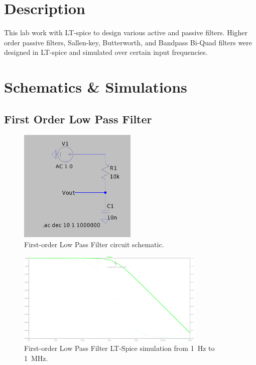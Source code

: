 \documentclass[CMPE]{../KGCOEReport}
\begin{document}
    \maketitle
    \section*{Description}

   	This lab work with LT-spice to design various active and passive filters. Higher
   	order passive filters, Sallen-key, Butterworth, and Bandpass Bi-Quad filters were
   	designed in LT-spice and simulated over certain input frequencies.

    \section*{Schematics \& Simulations}

	\subsection*{First Order Low Pass Filter}

	\begin{figure}[ht]
		\centering
		\includegraphics[width=0.5\textwidth]{first_order_schem}
		\caption{First-order Low Pass Filter circuit schematic.}
		\label{fig:first_order_schem}
	\end{figure}

	\begin{figure}[ht]
		\centering
		\includegraphics[width=0.8\textwidth]{first_order}
		\caption{First-order Low Pass Filter LT-Spice simulation from \SI{1}{\Hz} to \SI{1}{\mega\Hz}.}
		\label{fig:first_order}
	\end{figure}
	\pagebreak
\end{document}
